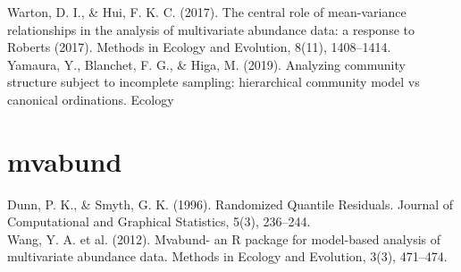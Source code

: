 \documentclass{article}
\begin{document}
Warton, D. I., \& Hui, F. K. C. (2017). The central role of mean-variance relationships in the analysis of multivariate abundance data: a response to Roberts (2017). Methods in Ecology and Evolution, 8(11), 1408–1414. \\

Yamaura, Y., Blanchet, F. G., \& Higa, M. (2019). Analyzing community structure subject to incomplete sampling: hierarchical community model vs canonical ordinations. Ecology\\
\section{mvabund}
Dunn, P. K., \& Smyth, G. K. (1996). Randomized Quantile Residuals. Journal of Computational and Graphical Statistics, 5(3), 236–244. \\

Wang, Y. A. et al. (2012). Mvabund- an R package for model-based analysis of multivariate abundance data. Methods in Ecology and Evolution, 3(3), 471–474. \\
\end{document}
